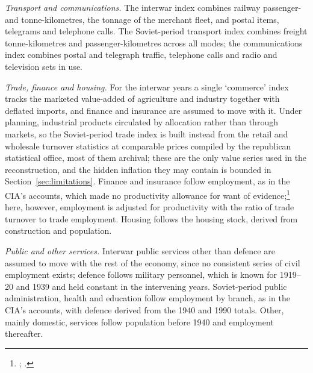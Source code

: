 \textit{Transport and communications.} The interwar index combines railway passenger- and tonne-kilometres, the tonnage of the merchant fleet, and postal items, telegrams and telephone calls. The Soviet-period transport index combines freight tonne-kilometres and passenger-kilometres across all modes; the communications index combines postal and telegraph traffic, telephone calls and radio and television sets in use.

\textit{Trade, finance and housing.} For the interwar years a single `commerce' index tracks the marketed value-added of agriculture and industry together with deflated imports, and finance and insurance are assumed to move with it. Under planning, industrial products circulated by allocation rather than through markets, so the Soviet-period trade index is built instead from the retail and wholesale turnover statistics at comparable prices compiled by the republican statistical office, most of them archival; these are the only value series used in the reconstruction, and the hidden inflation they may contain is bounded in Section~\ref{sec:limitations}. Finance and insurance follow employment, as in the CIA's accounts, which made no productivity allowance for want of evidence;\footnote{\autocite[49]{cia1982a}; \autocite[319]{Maddison1998b}.} here, however, employment is adjusted for productivity with the ratio of trade turnover to trade employment. Housing follows the housing stock, derived from construction and population.

\textit{Public and other services.} Interwar public services other than defence are assumed to move with the rest of the economy, since no consistent series of civil employment exists; defence follows military personnel, which is known for 1919--20 and 1939 and held constant in the intervening years. Soviet-period public administration, health and education follow employment by branch, as in the CIA's accounts, with defence derived from the 1940 and 1990 totals. Other, mainly domestic, services follow population before 1940 and employment thereafter.

